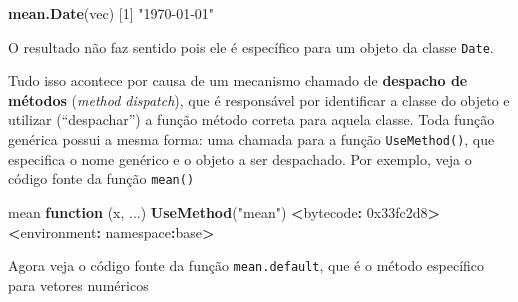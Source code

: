 \documentclass[10pt,a4paper]{book}
\newenvironment{Shaded}{\begin{snugshade}}{\end{snugshade}}
\newcommand{\KeywordTok}[1]{\textcolor[rgb]{0.13,0.29,0.53}{\textbf{#1}}}
\newcommand{\DecValTok}[1]{\textcolor[rgb]{0.00,0.00,0.81}{#1}}
\newcommand{\StringTok}[1]{\textcolor[rgb]{0.31,0.60,0.02}{#1}}
\newcommand{\ControlFlowTok}[1]{\textcolor[rgb]{0.13,0.29,0.53}{\textbf{#1}}}
\newcommand{\OperatorTok}[1]{\textcolor[rgb]{0.81,0.36,0.00}{\textbf{#1}}}
\newcommand{\ErrorTok}[1]{\textcolor[rgb]{0.64,0.00,0.00}{\textbf{#1}}}
\newcommand{\NormalTok}[1]{#1}
\begin{document}
\begin{Shaded}
\begin{Highlighting}[]
\KeywordTok{mean.Date}\NormalTok{(vec)}
\NormalTok{[}\DecValTok{1}\NormalTok{] }\StringTok{"1970-01-01"}
\end{Highlighting}
\end{Shaded}

O resultado não faz sentido pois ele é específico para um objeto da
classe \texttt{Date}.

Tudo isso acontece por causa de um mecanismo chamado de \textbf{despacho
de métodos} (\emph{method dispatch}), que é responsável por identificar
a classe do objeto e utilizar (``despachar'') a função método correta
para aquela classe. Toda função genérica possui a mesma forma: uma
chamada para a função \texttt{UseMethod()}, que especifica o nome
genérico e o objeto a ser despachado. Por exemplo, veja o código fonte
da função \texttt{mean()}

\begin{Shaded}
\begin{Highlighting}[]
\NormalTok{mean}
\ControlFlowTok{function}\NormalTok{ (x, ...) }
\KeywordTok{UseMethod}\NormalTok{(}\StringTok{"mean"}\NormalTok{)}
\OperatorTok{<}\NormalTok{bytecode}\OperatorTok{:}\StringTok{ }\DecValTok{0x33fc2d8}\OperatorTok{>}
\ErrorTok{<}\NormalTok{environment}\OperatorTok{:}\StringTok{ }\NormalTok{namespace}\OperatorTok{:}\NormalTok{base}\OperatorTok{>}
\end{Highlighting}
\end{Shaded}

Agora veja o código fonte da função \texttt{mean.default}, que é o
método específico para vetores numéricos
\end{document}
